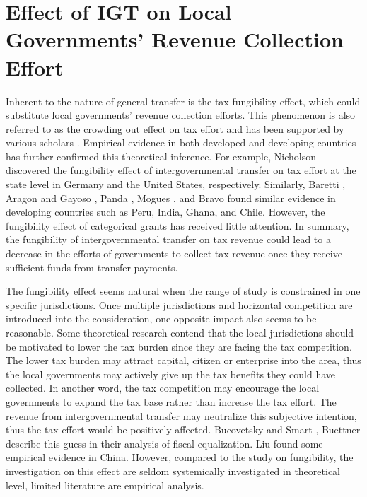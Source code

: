 

\chapter{Effect of IGT on Local Governments' Revenue Collection Effort}

Inherent to the nature of general transfer is the tax fungibility effect, which could substitute local governments' revenue collection efforts. This phenomenon is also referred to as the crowding out effect on tax effort and has been supported by various scholars \cite{inman1988federal,peterson1997decentralization,litvack1998rethinking}. Empirical evidence in both developed and developing countries has further confirmed this theoretical inference. For example, Nicholson \cite{nicholson2008fiscal} discovered the fungibility effect of intergovernmental transfer on tax effort at the state level in Germany and the United States, respectively. Similarly, Baretti \cite{2002A}, Aragon and Gayoso \cite{aragon2005intergovernmental}, Panda \cite{panda2009central}, Mogues \cite{mogues2012external}, and Bravo \cite{bravo2013income} found similar evidence in developing countries such as Peru, India, Ghana, and Chile. However, the fungibility effect of categorical grants has received little attention. In summary, the fungibility of intergovernmental transfer on tax revenue could lead to a decrease in the efforts of governments to collect tax revenue once they receive sufficient funds from transfer payments.

The fungibility effect seems natural when the range of study is constrained in one specific jurisdictions. Once multiple jurisdictions and horizontal competition are introduced into the consideration, one opposite impact also seems to be reasonable. Some theoretical research contend that the local jurisdictions should be motivated to lower the tax burden since they are facing the tax competition. The lower tax burden may attract capital, citizen or enterprise into the area, thus the local governments may actively give up the tax benefits they could have collected. In another word, the tax competition may encourage the local governments to expand the tax base rather than increase the tax effort. The revenue from intergovernmental transfer may neutralize this subjective intention, thus the tax effort would be positively affected. Bucovetsky and Smart \cite{2010The}, Buettner \cite{2006The} describe this guess in their analysis of fiscal equalization. Liu \cite{2011Intergovernmental}
found some empirical evidence in China. However, compared to the study on fungibility, the investigation on this effect are seldom systemically investigated in theoretical level, limited literature are empirical analysis.

